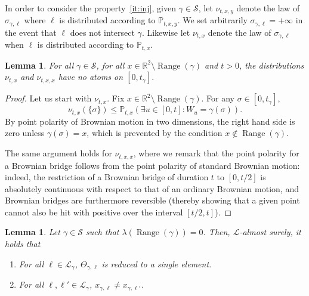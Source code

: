 \documentclass[11pt]{article}
\newtheorem{lemma}[theorem]{Lemma}
\def\P{{\mathbb P}}
\DeclareMathOperator{\Range}{Range}
\begin{document}
In order to consider the property~\eqref{it:inj}, given $\gamma\in \mathscr{S}$, let $\nu_{t,x,y}$ denote the law of $\sigma_{\gamma,\ell}$ where $\ell$ is distributed according to $\P_{t,x,y}$. We set arbitrarily $\sigma_{\gamma,\ell}=+\infty$ in the event that $\ell$ does not intersect $\gamma$.
Likewise let $\nu_{t,x}$ denote the law of $\sigma_{\gamma,\ell}$ when $\ell$ is distributed according to $\P_{t,x}$.
\begin{lemma}
    \label{le:noAtom}
    For all $\gamma\in \mathscr{S}$, for all
    $x\in \mathbb{R}^2\setminus \Range(\gamma)$ and $t>0$, the distributions $\nu_{t,x}$ and $\nu_{t,x,x}$ have no atoms on $[0,t_\gamma ]$.
\end{lemma}
\begin{proof}
    Let us start with $\nu_{t,x}$. Fix $x\in \mathbb{R}^2\setminus \Range(\gamma)$. For any $\sigma\in[0,t_\gamma ]$,
    \[
    \nu_{t,x}(\{\sigma\})\leq \mathbb{P}_{t,x}(\exists u\in[0,t]: W_u=\gamma(\sigma)).
    \]
    By point polarity of Brownian motion in two dimensions, the right hand side is zero unless $\gamma(\sigma)=x$, which is prevented by the condition $x \notin \Range(\gamma)$.

    The same argument holds for $\nu_{t,x,x}$, where we remark that the point polarity for a Brownian bridge follows from the point polarity of standard Brownian motion: indeed, the restriction of a Brownian bridge of duration $t$ to $[0, t/2]$ is absolutely continuous with respect to that of an ordinary Brownian motion, and Brownian bridges are furthermore reversible (thereby showing that a given point cannot also be hit with positive over the interval $[t/2, t]$).
\end{proof}
\begin{lemma}
\label{le:item:inj}
    Let $\gamma\in \mathscr{S}$ such that $\lambda(\Range(\gamma))=0 $. Then,
    $\mathcal{L}$-almost surely,
    it holds that
    \begin{enumerate}
        \item For all $\ell \in \mathcal{L}_\gamma$, $\Theta_{\gamma,\ell}$ is reduced to a single element.
        \item For all $\ell,\ell' \in \mathcal{L}_\gamma$, $x_{\gamma,\ell}\neq x_{\gamma,\ell'}$.
    \end{enumerate}
\end{lemma}
\end{document}
